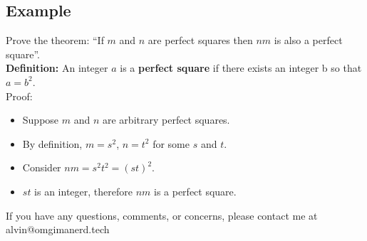 \documentclass[letterpaper, 12pt]{math}
\begin{document}
\subsection*{Example}
Prove the theorem: ``If \( m \) and \( n \) are perfect squares then \( nm \)
is also a perfect square''. \\
\textbf{Definition:} An integer \( a \) is a \textbf{perfect square} if there
exists an integer b so that \( a = b^{2} \). \\
Proof:
\begin{itemize}
  \item Suppose \( m \) and \( n \) are arbitrary perfect squares.
  \item By definition, \( m = s^{2} \), \( n = t^{2} \) for some \( s \) and
    \( t \).
  \item Consider \( nm = s^{2}t^{2} = (st)^{2} \).
  \item \( st \) is an integer, therefore \( nm \) is a perfect square.
\end{itemize}

\begin{center}
  If you have any questions, comments, or concerns, please contact me at
  alvin@omgimanerd.tech
\end{center}
\end{document}
